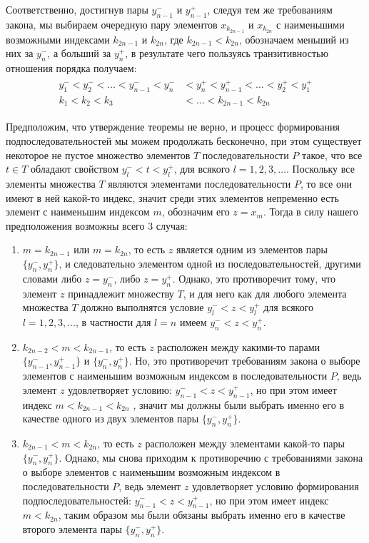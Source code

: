 \documentclass[12pt]{article}
\begin{document}
Соответственно, достигнув пары $y_{n - 1}^-$ и $y_{n - 1}^+$, следуя тем же требованиям закона, мы выбираем очередную пару элементов $x_{k_{2n - 1}}$ и $x_{k_{2n}}$ с наименьшими возможными индексами $k_{2n - 1}$ и $k_{2n}$, где $k_{2n - 1} < k_{2n}$, обозначаем меньший из них за $y_n^-$, а больший за $y_n^+$, в результате чего пользуясь транзитивностью отношения порядка получаем:
\begin{align}
\begin{split}
y_1^- < y_2^- < \dots < y_{n - 1}^- < y_{n}^- &< y_{n}^+ < y_{n - 1}^+ < \dots < y_2^+< y_1^+\\
k_1 < k_2 < k_3 &< \dots < k_{2n - 1} < k_{2n}
\end{split}
\end{align}

Предположим, что утверждение теоремы не верно, и процесс формирования подпоследовательностей мы можем продолжать бесконечно, при этом существует некоторое не пустое множество элементов $T$ последовательности $P$ такое, что все $t \in T$ обладают свойством $y_{l}^- < t < y_{l}^+$, для всякого $l = 1, 2, 3, \dots$. Поскольку все элементы множества $T$ являются элементами последовательности $P$, то все они имеют в ней какой-то индекс, значит среди этих элементов непременно есть элемент с наименьшим индексом $m$, обозначим его $z = x_m$. Тогда в силу нашего предположения возможны всего 3 случая:

\begin{enumerate}
    \item $m = k_{2n - 1}$ или $m = k_{2n}$, то есть $z$ является одним из элементов пары $\{y_{n}^-, y_{n}^+\}$, и следовательно элементом одной из последовательностей, другими словами либо $z = y_{n}^-$, либо $z = y_{n}^+$. Однако, это противоречит тому, что элемент $z$ принадлежит множеству $T$, и для него как для любого элемента множества $T$ должно выполнятся условие $y_{l}^- < z < y_{l}^+$ для всякого $l = 1, 2, 3, \dots$, в частности для $l = n$ имеем $y_{n}^- < z < y_{n}^+$.
    \item $k_{2n - 2} < m < k_{2n - 1}$, то есть $z$ расположен между какими-то парами $\{y_{n - 1}^-, y_{n - 1}^+\}$ и $\{y_{n}^-, y_{n}^+\}$. Но, это противоречит требованиям закона о выборе элементов с наименьшим возможным индексом в последовательности $P$, ведь элемент $z$ удовлетворяет условию: $y_{n - 1}^- < z < y_{n - 1}^+$, но при этом имеет индекс $m < k_{2n - 1} < k_{2n}$ , значит мы должны были выбрать именно его в качестве одного из двух элементов пары $\{y_{n}^-, y_{n}^+\}$.
    \item $k_{2n - 1} < m < k_{2n}$, то есть $z$ расположен между элементами какой-то пары $\{y_{n}^-, y_{n}^+\}$. Однако, мы снова приходим к противоречию с требованиями закона о выборе элементов с наименьшим возможным индексом в последовательности $P$, ведь элемент $z$ удовлетворяет условию формирования подпоследовательностей: $y_{n - 1}^- < z < y_{n - 1}^+$, но при этом имеет индекс $m < k_{2n}$, таким образом мы были обязаны выбрать именно его в качестве второго элемента пары $\{y_{n}^-, y_{n}^+\}$.
\end{enumerate}
\end{document}
